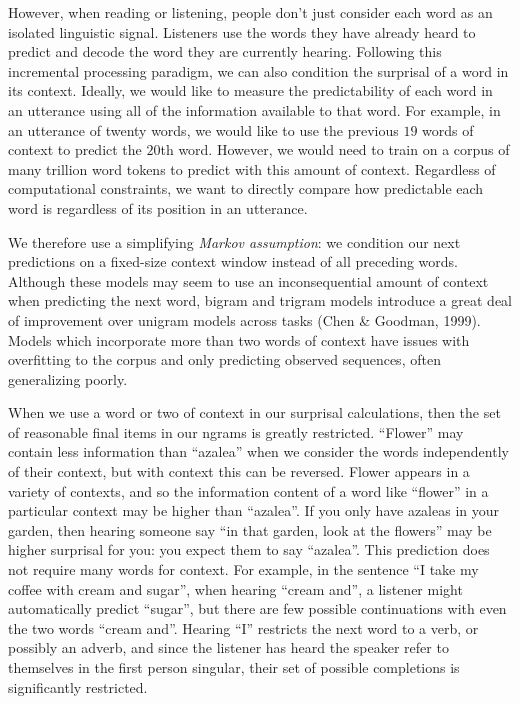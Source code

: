 \documentclass[man,floatsintext]{apa6}
\begin{document}
However, when reading or listening, people don't just consider each word as an isolated linguistic signal. Listeners use the words they have already heard to predict and decode the word they are currently hearing. Following this incremental processing paradigm, we can also condition the surprisal of a word in its context. Ideally, we would like to measure the predictability of each word in an utterance using all of the information available to that word. For example, in an utterance of twenty words, we would like to use the previous \(19\) words of context to predict the \(20\)th word. However, we would need to train on a corpus of many trillion word tokens to predict with this amount of context. Regardless of computational constraints, we want to directly compare how predictable each word is regardless of its position in an utterance.

We therefore use a simplifying \emph{Markov assumption}: we condition our next predictions on a fixed-size context window instead of all preceding words. Although these models may seem to use an inconsequential amount of context when predicting the next word, bigram and trigram models introduce a great deal of improvement over unigram models across tasks (Chen \& Goodman, 1999). Models which incorporate more than two words of context have issues with overfitting to the corpus and only predicting observed sequences, often generalizing poorly.

When we use a word or two of context in our surprisal calculations, then the set of reasonable final items in our ngrams is greatly restricted. \enquote{Flower} may contain less information than \enquote{azalea} when we consider the words independently of their context, but with context this can be reversed. Flower appears in a variety of contexts, and so the information content of a word like \enquote{flower} in a particular context may be higher than \enquote{azalea}. If you only have azaleas in your garden, then hearing someone say \enquote{in that garden, look at the flowers} may be higher surprisal for you: you expect them to say \enquote{azalea}. This prediction does not require many words for context. For example, in the sentence \enquote{I take my coffee with cream and sugar}, when hearing \enquote{cream and}, a listener might automatically predict \enquote{sugar}, but there are few possible continuations with even the two words \enquote{cream and}. Hearing \enquote{I} restricts the next word to a verb, or possibly an adverb, and since the listener has heard the speaker refer to themselves in the first person singular, their set of possible completions is significantly restricted.
\end{document}
